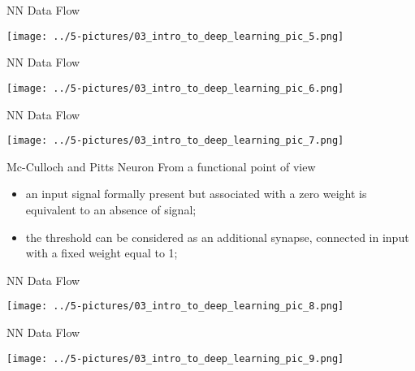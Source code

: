 \documentclass[11pt]{beamer}
\begin{document}
\begin{frame}{NN Data Flow}
	\begin{center}
	\texttt{[image: ../5-pictures/03\_intro\_to\_deep\_learning\_pic\_5.png]}
	\end{center}
\end{frame}
\begin{frame}{NN Data Flow}
	\begin{center}
	\texttt{[image: ../5-pictures/03\_intro\_to\_deep\_learning\_pic\_6.png]}
	\end{center}
\end{frame}
\begin{frame}{NN Data Flow}
	\begin{center}
	\texttt{[image: ../5-pictures/03\_intro\_to\_deep\_learning\_pic\_7.png]}
	\end{center}
\end{frame}
\begin{frame}{Mc-Culloch and Pitts Neuron}
From a functional point of view
	\begin{itemize}
		\item an input signal formally present but associated with a zero weight is equivalent to an absence of signal;
		\item the threshold can be considered as an additional synapse, connected in input with a fixed weight equal to 1;
	\end{itemize}
\end{frame}
\begin{frame}{NN Data Flow}
	\begin{center}
	\texttt{[image: ../5-pictures/03\_intro\_to\_deep\_learning\_pic\_8.png]}
	\end{center}
\end{frame}
\begin{frame}{NN Data Flow}
	\begin{center}
	\texttt{[image: ../5-pictures/03\_intro\_to\_deep\_learning\_pic\_9.png]}
	\end{center}
\end{frame}
\end{document}
